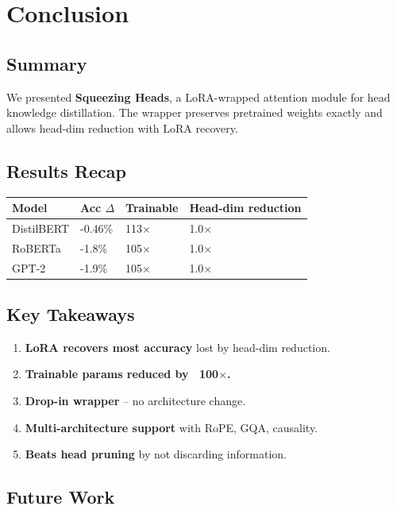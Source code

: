 
\section{Conclusion}

\subsection{Summary}

We presented \textbf{Squeezing Heads}, a LoRA-wrapped attention module for head 
knowledge distillation. The wrapper preserves pretrained weights exactly 
and allows head-dim reduction with LoRA recovery.

\subsection{Results Recap}

\begin{table}[H]
\centering
\small
\begin{tabular}{llll}
\toprule
\textbf{Model} & \textbf{Acc $\Delta$} & \textbf{Trainable} & \textbf{Head-dim reduction} \\
\midrule
DistilBERT & -0.46\% & 113$\times$ & 1.0$\times$ \\
RoBERTa & -1.8\% & 105$\times$ & 1.0$\times$ \\
GPT-2 & -1.9\% & 105$\times$ & 1.0$\times$ \\
\bottomrule
\end{tabular}
\end{table}

\subsection{Key Takeaways}

\begin{enumerate}
\item \textbf{LoRA recovers most accuracy} lost by head-dim reduction.
\item \textbf{Trainable params reduced by ~100$\times$.}
\item \textbf{Drop-in wrapper} -- no architecture change.
\item \textbf{Multi-architecture support} with RoPE, GQA, causality.
\item \textbf{Beats head pruning} by not discarding information.

\end{enumerate}
\subsection{Future Work}

